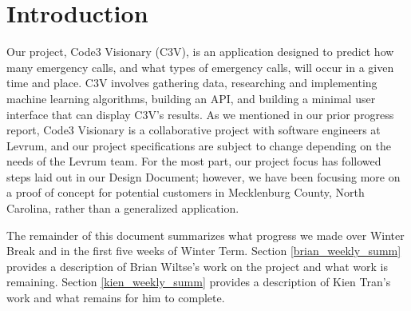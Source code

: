 \documentclass[onecolumn, draftclsnofoot,10pt, compsoc]{IEEEtran}
\begin{document}
\section{Introduction}
\begin{singlespace}
Our project, Code3 Visionary (C3V), is an application designed to predict how many emergency calls, and what types of emergency calls, will occur in a given time and place. 
C3V involves gathering data, researching and implementing machine learning algorithms, building an API, and building a minimal user interface that can display C3V's results. 
As we mentioned in our prior progress report, Code3 Visionary is a collaborative project with software engineers at Levrum, and our project specifications are subject to change depending on the needs of the Levrum team.
For the most part, our project focus has followed steps laid out in our Design Document;
however, we have been focusing more on a proof of concept for potential customers in Mecklenburg County, North Carolina, rather than a generalized application.

The remainder of this document summarizes what progress we made over Winter Break and in the first five weeks of Winter Term.
Section \ref{brian_weekly_summ} provides a description of Brian Wiltse's work on the project and what work is remaining.
Section \ref{kien_weekly_summ} provides a description of Kien Tran's work and what remains for him to complete.

\end{singlespace}
\end{document}
